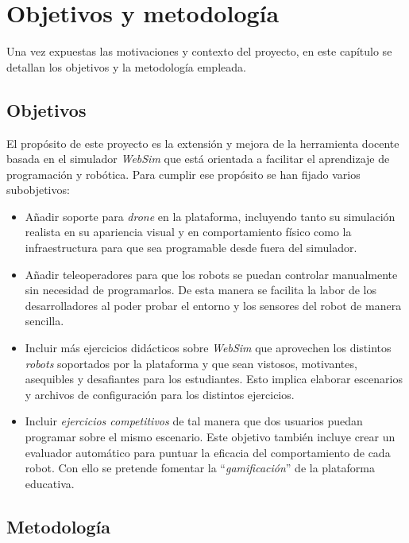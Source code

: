 \chapter{Objetivos y metodología}\label{chap:objetivos}
Una vez expuestas las motivaciones y contexto del proyecto, en este capítulo se detallan los objetivos y la metodología empleada. 

\section{Objetivos}
El propósito de este proyecto es la extensión y mejora de la herramienta docente basada en el simulador \textit{WebSim} que está orientada a facilitar el aprendizaje de programación y robótica. Para cumplir ese propósito se han fijado varios subobjetivos:
\begin{itemize}
    \item Añadir soporte para \textit{drone} en la plataforma, incluyendo tanto su simulación realista en su apariencia visual y en comportamiento físico como la infraestructura para que sea programable desde fuera del simulador.
        
    \item Añadir teleoperadores para que los robots se puedan controlar manualmente sin necesidad de programarlos. De esta manera se facilita la labor de los desarrolladores al poder probar el entorno y los sensores del robot de manera sencilla.
    
    \item Incluir más ejercicios didácticos sobre \textit{WebSim} que aprovechen los distintos \textit{robots} soportados por la plataforma y que sean vistosos, motivantes, asequibles y desafiantes para los estudiantes. Esto implica elaborar escenarios y archivos de configuración para los distintos ejercicios. 

    \item Incluir \textit{ejercicios competitivos} de tal manera que dos usuarios puedan programar sobre el mismo escenario. Este objetivo también incluye crear un evaluador automático para puntuar la eficacia del comportamiento de cada robot. Con ello se pretende fomentar la ``\textit{gamificación}'' de la plataforma educativa.
    
\end{itemize}
\section{Metodología}
\label{sec:metodologia}

